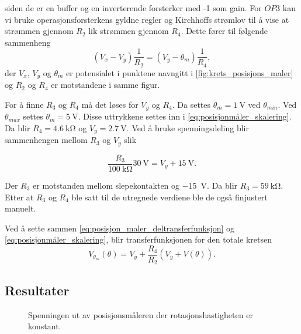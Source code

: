 siden de er en buffer og en inverterende forsterker med -1 som gain.
For $OP3$ kan vi bruke operasjonsforsterkens gyldne regler og Kirchhoffs strømlov til å vise at strømmen gjennom $R_2$ lik strømmen gjennom $R_4$. Dette fører til følgende sammenheng
\begin{equation}
    \label{eq:posisjonmåler_skalering}
    (V_x - V_y) \frac{1}{R_2} = (V_y - \theta_m) \frac{1}{R_4},
\end{equation}
der $V_x$, $V_y$ og $\theta_m$ er potensialet i punktene navngitt i \autoref{fig:krets_posisjons_maler} og $R_2$ og $R_4$ er motstandene i samme figur.

For å finne $R_3$ og $R_4$ må det løses for $V_y$ og $R_4$.
Da settes $\theta_m = \SI{1}{\volt}$ ved $\theta_{min}$.
Ved $\theta_{max}$ settes $\theta_m = \SI{5}{\volt}$.
Disse uttrykkene settes inn i \eqref{eq:posisjonmåler_skalering}. 
Da blir $R_4 = \SI{4.6}{\kilo\ohm}$ og 
$V_y = \SI{2.7}{\volt}$.
Ved å bruke spenningsdeling blir sammenhengen mellom $R_3$ og $V_y$ slik

\begin{equation}
    \label{eq:posisjon_maler_R3}
    \frac{R_3}{\SI{100}{\kilo\ohm}} \SI{30}{\volt} = V_y + \SI{15}{\volt}.
\end{equation}

Der $R_3$ er motstanden mellom slepekontakten og \SI{-15}{\volt}.
Da blir $R_3 = \SI{59}{\kilo\ohm}$. Etter at $R_3$ og $R_4$ ble satt til de utregnede verdiene ble de også finjustert manuelt.

Ved å sette sammen \eqref{eq:posisjon_maler_deltransferfunksjon} og \eqref{eq:posisjonmåler_skalering}, blir transferfunksjonen for den totale kretsen
\begin{equation}
    \label{eq:posisjon_maling_transferfuksjon}
    V_{\theta_m}(\theta) = V_y + \frac{R_4}{R_2}(V_y + V(\theta)).
\end{equation}







\subsection{Resultater}

\begin{figure}[h]
    \centering
    
    \caption{Spenningen ut av posisjonsmåleren der rotasjonshastigheten er konstant.}
    \label{fig:posisjon_sagtann}
\end{figure}

